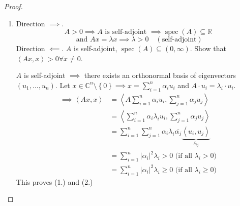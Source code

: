 \documentclass{article}
\newcommand{\set}[1]{\left\{#1\right\}}
\newcommand{\angel}[1]{\left\langle#1\right\rangle}
\newcommand{\card}[1]{\left|#1\right|}
\begin{document}
\begin{proof}
  \begin{enumerate}
    \item Direction $\implies$.
      \[ A > 0 \implies A \text{ is self-adjoint } \implies \operatorname{spec}(A) \subseteq \mathbb R \]
      \[ \text{ and } Ax = \lambda x \implies \lambda > 0 \quad (\text{self-adjoint}) \]
      Direction $\impliedby$.
      $A$ is self-adjoint, $\operatorname{spec}(A) \subseteq (0, \infty)$.
      Show that $\angel{Ax, x} > 0 \forall x \neq 0$.

      $A$ is self-adjoint $\implies$ there exists an orthonormal basis of eigenvectors $(u_1, \dots, u_n)$.
      Let $x \in \mathbb C^n \setminus \set{0} \implies x = \sum_{i=1}^n \alpha_i u_i$ and $A \cdot u_i = \lambda_i \cdot u_i$.
      \begin{align*}
        \implies \angel{Ax,x} &= \angel{A \sum_{i=1}^n \alpha_i u_i, \sum_{j=1}^n \alpha_j u_j} \\
          &= \angel{\sum_{i=1}^n \alpha_i \lambda_i u_i, \sum_{j=1}^n \alpha_j u_j} \\
          &= \sum_{i=1}^n \sum_{j=1}^n \alpha_i \lambda_i \overline{\alpha_j} \underbrace{\angel{u_i,u_j}}_{\delta_{ij}} \\
          &= \sum_{i=1}^n \card{\alpha_i}^2 \lambda_i > 0 \text{ (if all $\lambda_i > 0$)} \\
          &= \sum_{i=1}^n \card{\alpha_i}^2 \lambda_i \geq 0 \text{ (if all $\lambda_i \geq 0$)}
      \end{align*}
      This proves (1.) and (2.)
  \end{enumerate}
\end{proof}
\end{document}
